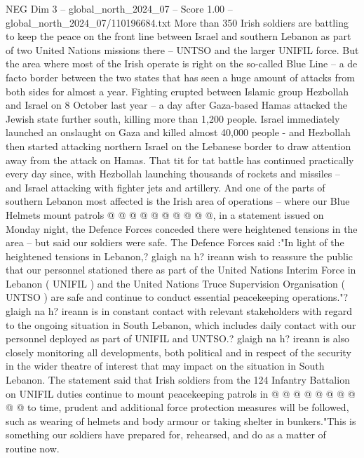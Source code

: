 \begin{textsample}{NEG Dim 3 – global\_north\_2024\_07 – Score 1.00 – global\_north\_2024\_07/110196684.txt}  \label{ex:f3_neg_371}
More than 350 Irish soldiers are battling to keep the peace on the front line between Israel and southern Lebanon as part of two United Nations missions there -- UNTSO and the larger UNIFIL force.
But the area where most of the Irish operate is right on the so-called Blue Line -- a de facto border between the two states that has seen a huge amount of attacks from both sides for almost a year.
Fighting erupted between Islamic group Hezbollah and Israel on 8 October last year -- a day after Gaza-based Hamas attacked the Jewish state further south, killing more than 1,200 people.
Israel immediately launched an onslaught on Gaza and killed almost 40,000 people - and Hezbollah then started attacking northern Israel on the Lebanese border to draw attention away from the attack on Hamas.
That tit for tat battle has continued practically every day since, with Hezbollah launching thousands of rockets and missiles -- and Israel attacking with fighter jets and artillery.
And one of the parts of southern Lebanon most affected is the Irish area of operations -- where our Blue Helmets mount patrols @ @ @ @ @ @ @ @ @ @, in a statement issued on Monday night, the Defence Forces conceded there were heightened tensions in the area -- but said our soldiers were safe.
The Defence Forces said :"In light of the heightened tensions in Lebanon,? glaigh na h? ireann wish to reassure the public that our personnel stationed there as part of the United Nations Interim Force in Lebanon ( UNIFIL ) and the United Nations Truce Supervision Organisation ( UNTSO ) are safe and continue to conduct essential peacekeeping operations."? glaigh na h? ireann is in constant contact with relevant stakeholders with regard to the ongoing situation in South Lebanon, which includes daily contact with our personnel deployed as part of UNIFIL and UNTSO.? glaigh na h? ireann is also closely monitoring all developments, both political and in respect of the security in the wider theatre of interest that may impact on the situation in South Lebanon.
The statement said that Irish soldiers from the 124 Infantry Battalion on UNIFIL duties continue to mount peacekeeping patrols in @ @ @ @ @ @ @ @ @ @ to time, prudent and additional force protection measures will be followed, such as wearing of helmets and body armour or taking shelter in bunkers."This is something our soldiers have prepared for, rehearsed, and do as a matter of routine now.

\end{textsample}
